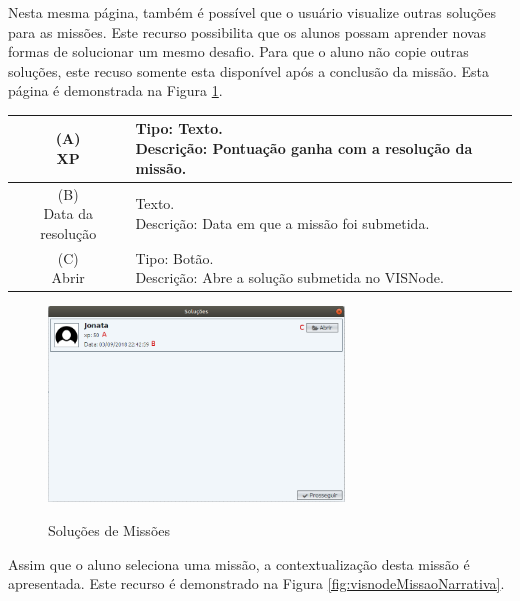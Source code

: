 \documentclass[
	12pt,				%
	oneside,			%
	a4paper,			%
	english,			%
	french,				%
	spanish,			%
	brazil,				%
	]{abntex2}
\begin{document}
Nesta mesma página, também é possível que o usuário visualize outras soluções para as missões. Este recurso possibilita que os alunos possam aprender novas formas de solucionar um mesmo desafio. Para que o aluno não copie outras soluções, este recuso somente esta disponível após a conclusão da missão. Esta página é demonstrada na Figura \ref{fig:visnodeMissaoSolucoes}. 

\begin{table}[H]
\centering
{} \label{tab:listagemMissoesSolucoes}
\renewcommand{\arraystretch}{1.8}
\setlength{\tabcolsep}{10pt}
\begin{tabular}{|c|l|}
  \hline
  \makecell{(A) \\ XP} 
  &
  \makecell[l]{Tipo: Texto.\\ Descrição: Pontuação ganha com a resolução da missão.} \\
  \hline
  \makecell{(B) \\ Data da resolução} 
  &
  \makecell[l]{Texto.\\ Descrição: Data em que a missão foi submetida.} \\
  \hline
  \makecell{(C) \\ Abrir} 
  &
  \makecell[l]{Tipo: Botão.\\ Descrição: Abre a solução submetida no VISNode.} \\
  \hline  
\end{tabular}
\centering
\sourceAuthor
\end{table}

\begin{figure}[H]
\centering
\caption{Soluções de Missões}
\includegraphics[width=0.7\textwidth]{imagens/visnode_missoes_solucoes.png}
\sourceAuthor
\label{fig:visnodeMissaoSolucoes}
\end{figure}



Assim que o aluno seleciona uma missão, a contextualização desta missão é apresentada. Este recurso é demonstrado na Figura \ref{fig:visnodeMissaoNarrativa}.
\end{document}
